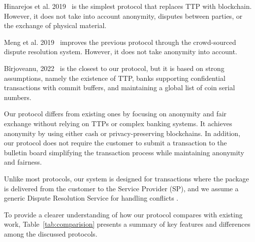 \documentclass[pdftex,twocolumn,epjc3]{svjour3}
\begin{document}
Hinarejos et al. 2019~\cite{hinarejosSolutionSecureCertified2019} is the simplest protocol that replaces TTP with blockchain. However, it does not take into account anonymity, disputes between parties, or the exchange of physical material.

Meng et al. 2019~\cite{mengThemisDecentralizedEscrow2019} improves the previous protocol through the crowd-sourced dispute resolution system. However, it does not take anonymity into account.

Bîrjoveanu, 2022~\cite{birjoveanuTwoPartyECommerceProtocols2022} is the closest to our protocol, but it is based on strong assumptions, namely the existence of TTP, banks supporting confidential transactions with commit buffers, and maintaining a global list of coin serial numbers.

Our protocol differs from existing ones by focusing on anonymity and fair exchange without relying on TTPs or complex banking systems. It achieves anonymity by using either cash or privacy-preserving blockchains. In addition, our protocol does not require the customer to submit a transaction to the bulletin board simplifying the transaction process while maintaining anonymity and fairness.

Unlike most protocols, our system is designed for transactions where the package is delivered from the customer to the Service Provider (SP), and we assume a generic Dispute Resolution Service for handling conflicts .

To provide a clearer understanding of how our protocol compares with existing work, Table~\ref{tab:comparision} presents a summary of key features and differences among the discussed protocols.
\end{document}
